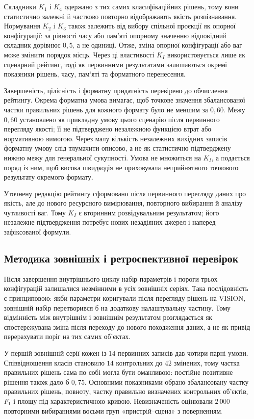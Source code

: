 Складники $K_1$ і $K_4$ одержано з тих самих класифікаційних рішень, тому вони статистично залежні й частково повторно відображають якість розпізнавання. Нормування $K_2$ і $K_3$ також залежить від вибору спільної проєкції як опорної конфігурації: за рівності часу або пам’яті опорному значенню відповідний складник дорівнює $0{,}5$, а не одиниці. Отже, зміна опорної конфігурації або ваг може змінити порядок місць. Через ці властивості $K_I$ використовується лише як сценарний рейтинг, тоді як первинними результатами залишаються окремі показники рішень, часу, пам’яті та форматного перенесення.

Завершеність, цілісність і форматну придатність перевірено до обчислення рейтингу. Окрема форматна умова вимагає, щоб точкове значення збалансованої частки правильних рішень для кожного формату було не меншим за $0{,}60$. Межу $0{,}60$ установлено як прикладну умову цього сценарію після первинного перегляду якості; її не підтверджено незалежною функцією втрат або нормативною вимогою. Через малу кількість незалежних вихідних записів форматну умову слід тлумачити описово, а не як статистично підтверджену нижню межу для генеральної сукупності. Умова не множиться на $K_I$, а подається поряд із ним, щоб висока швидкодія не приховувала неприйнятного точкового результату окремого формату.

Уточнену редакцію рейтингу сформовано після первинного перегляду даних про якість, але до нового ресурсного вимірювання, повторного вибирання й аналізу чутливості ваг. Тому $K_I$ є вторинним розвідувальним результатом; його незалежне підтвердження потребує нових незадіяних джерел і наперед зафіксованої формули.

\subsection{Методика зовнішніх і ретроспективної перевірок}

Після завершення внутрішнього циклу набір параметрів і пороги трьох конфігурацій залишалися незмінними в усіх зовнішніх серіях. Така послідовність є принциповою: якби параметри коригували після перегляду рішень на VISION, зовнішній набір перетворився б на додаткову налаштувальну частину. Тому відмінність між внутрішнім і зовнішнім результатом розглядається як спостережувана зміна після переходу до нового походження даних, а не як привід перерахувати поріг на тих самих об’єктах.

У першій зовнішній серії кожен із $14$ первинних записів дав чотири парні умови. Співвідношення класів становило $14$ контрольних до $42$ змінених, тому частка правильних рішень сама по собі могла бути оманливою: постійне позитивне рішення також дало б $0{,}75$. Основними показниками обрано збалансовану частку правильних рішень, повноту, частку правильно визначених контрольних об’єктів, $F_1$ і площу під характеристичною кривою. Невизначеність оцінювали $2\,000$ повторними вибираннями восьми груп «пристрій--сцена» з поверненням.


